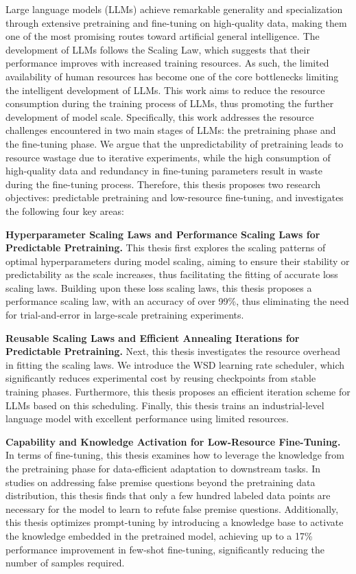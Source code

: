 \begin{abstract*}  
Large language models (LLMs) achieve remarkable generality and specialization through extensive pretraining and fine-tuning on high-quality data, making them one of the most promising routes toward artificial general intelligence. The development of LLMs follows the Scaling Law, which suggests that their performance improves with increased training resources. As such, the limited availability of human resources has become one of the core bottlenecks limiting the intelligent development of LLMs. This work aims to reduce the resource consumption during the training process of LLMs, thus promoting the further development of model scale. Specifically, this work addresses the resource challenges encountered in two main stages of LLMs: the pretraining phase and the fine-tuning phase. We argue that the unpredictability of pretraining leads to resource wastage due to iterative experiments, while the high consumption of high-quality data and redundancy in fine-tuning parameters result in waste during the fine-tuning process. Therefore, this thesis proposes two research objectives: predictable pretraining and low-resource fine-tuning, and investigates the following four key areas:

\textbf{Hyperparameter Scaling Laws and Performance Scaling Laws for Predictable Pretraining.} This thesis first explores the scaling patterns of optimal hyperparameters during model scaling, aiming to ensure their stability or predictability as the scale increases, thus facilitating the fitting of accurate loss scaling laws. Building upon these loss scaling laws, this thesis proposes a performance scaling law, with an accuracy of over 99\%, thus eliminating the need for trial-and-error in large-scale pretraining experiments.
  
\textbf{Reusable Scaling Laws and Efficient Annealing Iterations for Predictable Pretraining.} Next, this thesis investigates the resource overhead in fitting the scaling laws. We introduce the WSD learning rate scheduler, which significantly reduces experimental cost by reusing checkpoints from stable training phases. Furthermore, this thesis proposes an efficient iteration scheme for LLMs based on this scheduling. Finally, this thesis trains an industrial-level language model with excellent performance using limited resources.
  
\textbf{Capability and Knowledge Activation for Low-Resource Fine-Tuning.}
In terms of fine-tuning, this thesis examines how to leverage the knowledge from the pretraining phase for data-efficient adaptation to downstream tasks. In studies on addressing false premise questions beyond the pretraining data distribution, this thesis finds that only a few hundred labeled data points are necessary for the model to learn to refute false premise questions. Additionally, this thesis optimizes prompt-tuning by introducing a knowledge base to activate the knowledge embedded in the pretrained model, achieving up to a 17\% performance improvement in few-shot fine-tuning, significantly reducing the number of samples required.
  

\end{abstract*}
